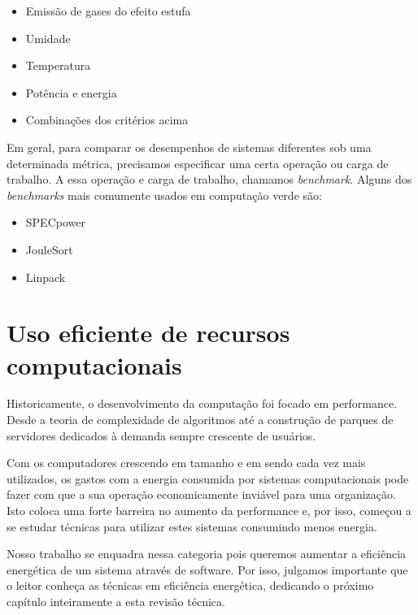 \begin{itemize}
    \item Emissão de gases do efeito estufa


    \item Umidade


    \item Temperatura


    \item Potência e energia

    \item Combinações dos critérios acima
\end{itemize}

Em geral, para comparar os desempenhos de sistemas diferentes sob uma determinada métrica, precisamos especificar uma certa operação ou carga de trabalho. A essa operação e carga de trabalho, chamamos \emph{benchmark}. Alguns dos \emph{benchmarks} mais comumente usados em computação verde são:
\begin{itemize}
    \item SPECpower
    \item JouleSort
    \item Linpack
\end{itemize}

\section{Uso eficiente de recursos computacionais}

Historicamente, o desenvolvimento da computação foi focado em performance. Desde a teoria de complexidade de algoritmos até a construção de parques de servidores dedicados à demanda sempre crescente de usuários.

Com os computadores crescendo em tamanho e em sendo cada vez mais utilizados, os gastos com a energia consumida por sistemas computacionais pode fazer com que a sua operação economicamente inviável para uma organização. Isto coloca uma forte barreira no aumento da performance e, por isso, começou a se estudar técnicas para utilizar estes sistemas consumindo menos energia.

Nosso trabalho se enquadra nessa categoria pois queremos aumentar a eficiência energética de um sistema através de software. Por isso, julgamos importante que o leitor conheça as técnicas em eficiência energética, dedicando o próximo capítulo inteiramente a esta revisão técnica.
